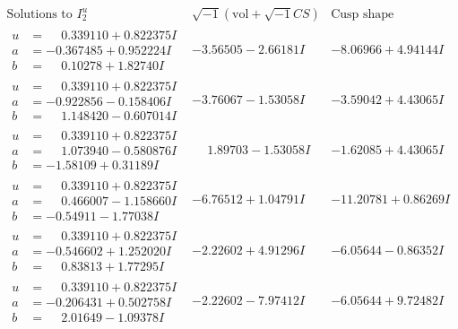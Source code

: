 \documentclass[1p]{elsarticle_modified}
\theoremstyle{definition}
\newcommand{\I}{\sqrt{-1}}
\begin{document}
$$\begin{array}{c|c|c}  
\text{Solutions to }I^u_{2}& \I (\text{vol} + \sqrt{-1}CS) & \text{Cusp shape}\\
 \hline 
\begin{aligned}
u &= \phantom{-}0.339110 + 0.822375 I \\
a &= -0.367485 + 0.952224 I \\
b &= \phantom{-}0.10278 + 1.82740 I\end{aligned}
 & -3.56505 - 2.66181 I & -8.06966 + 4.94144 I \\ \hline\begin{aligned}
u &= \phantom{-}0.339110 + 0.822375 I \\
a &= -0.922856 - 0.158406 I \\
b &= \phantom{-}1.148420 - 0.607014 I\end{aligned}
 & -3.76067 - 1.53058 I & -3.59042 + 4.43065 I \\ \hline\begin{aligned}
u &= \phantom{-}0.339110 + 0.822375 I \\
a &= \phantom{-}1.073940 - 0.580876 I \\
b &= -1.58109 + 0.31189 I\end{aligned}
 & \phantom{-}1.89703 - 1.53058 I & -1.62085 + 4.43065 I \\ \hline\begin{aligned}
u &= \phantom{-}0.339110 + 0.822375 I \\
a &= \phantom{-}0.466007 - 1.158660 I \\
b &= -0.54911 - 1.77038 I\end{aligned}
 & -6.76512 + 1.04791 I & -11.20781 + 0.86269 I \\ \hline\begin{aligned}
u &= \phantom{-}0.339110 + 0.822375 I \\
a &= -0.546602 + 1.252020 I \\
b &= \phantom{-}0.83813 + 1.77295 I\end{aligned}
 & -2.22602 + 4.91296 I & -6.05644 - 0.86352 I \\ \hline\begin{aligned}
u &= \phantom{-}0.339110 + 0.822375 I \\
a &= -0.206431 + 0.502758 I \\
b &= \phantom{-}2.01649 - 1.09378 I\end{aligned}
 & -2.22602 - 7.97412 I & -6.05644 + 9.72482 I \\ \hline\begin{aligned}

\end{aligned}
\end{array}$$
\end{document}
